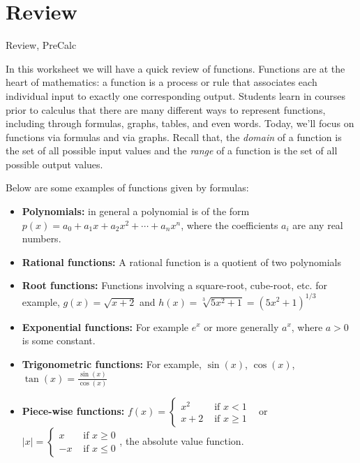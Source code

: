 \section{Review} 

\begin{tagblock}{Review, PreCalc}
\begin{question}

In this worksheet we will have a quick review of functions. Functions are at the heart of mathematics: a function is a process or rule that associates each individual input to exactly one corresponding output. Students learn in courses prior to calculus that there are many different ways to represent functions, including through formulas, graphs, tables, and even words. %
Today, we'll focus on functions via formulas and via graphs.  Recall that, the \emph{domain} of a function is the set of all possible input values and the \emph{range} of a function is the set of all possible output values.

\bigskip

Below are some examples of functions given by formulas: 

\begin{itemize}
\item \textbf{Polynomials:} in general a polynomial is of the form $p(x) = a_0 + a_1x + a_2x^2 + \cdots + a_nx^n$, where the coefficients $a_i$ are any real numbers.  
\item \textbf{Rational functions:} A rational function is a quotient of two polynomials 
\item \textbf{Root functions:} Functions involving a square-root, cube-root, etc.  for example, $g(x) = \sqrt{x+2}$ and $h(x)=\sqrt[3]{5x^2+1} = (5x^2+1)^{1/3}$
\item \textbf{Exponential functions:} For example $e^x$ or more generally $a^x$, where $a>0$ is some constant.
\item \textbf{Trigonometric functions:}  For example, $\sin(x)$, $\cos(x)$, $\tan(x) = \frac{\sin(x)}{\cos(x)}$ 
\item \textbf{Piece-wise functions:} 
$f(x) = \begin{cases} x^2 & \text{ if } x<1 \\ x+2 & \text{ if } x \geq 1 \end{cases} $ \, 
or  $|x|= \begin{cases} x & \text{ if } x\geq 0 \\ -x & \text{ if } x \leq 0 \end{cases} $, the absolute value function.  
\end{itemize} 


\end{question}
\end{tagblock}
